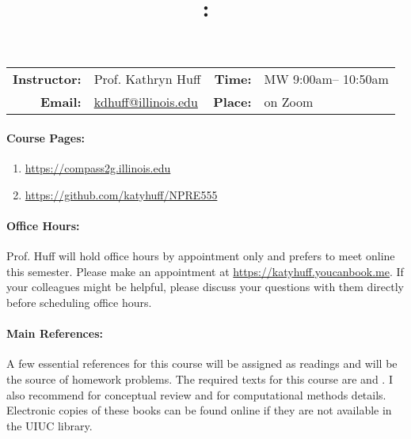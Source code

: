 \documentclass[11pt, a4paper]{article}
\title{\CourseNumber: \CourseTitle\\}
\author{\CourseUniversity}
\date{\CourseSemester \CourseYear}
\makeatletter
\newcommand{\CourseNumber}{NPRE555}
\newcommand{\CourseDays}{MW\xspace}%
\newcommand{\CourseStart}{9:00am\xspace}%
\newcommand{\CourseEnd}{10:50am\xspace}%
\newcommand{\CourseInstructor}{Prof. Kathryn Huff}
\newcommand{\CourseInstructorEmail}{kdhuff@illinois.edu}
\newcommand{\CourseRoom}{on Zoom\xspace}%
\newcommand{\CourseBuilding}{\xspace}%
\newcommand{\TeachingAssistant}{TA Name\xspace}%
\newcommand{\TAOfficeHourDays}{Wednesdays\xspace}%
\newcommand{\TAOfficeHourStart}{1:00pm\xspace}%
\newcommand{\TAOfficeHourEnd}{3:00pm\xspace}%
\newcommand{\TAOfficeHourPlace}{123 Talbot Laboratory\xspace}
\makeatother
\begin{document}
\maketitle
\renewcommand{\arraystretch}{2}
\begin{center}
\begin{table}[h]
\begin{tabularx}{\textwidth}{rXrX}
\hline
\textbf{Instructor:} & \CourseInstructor & \textbf{Time:} & \CourseDays \CourseStart -- \CourseEnd \\
\textbf{Email:} &  \href{mailto:\CourseInstructorEmail}{\CourseInstructorEmail} & \textbf{Place:} & \CourseRoom \CourseBuilding\\
\hline
\end{tabularx}

\end{table}
\end{center}

\paragraph{Course Pages:}
\begin{enumerate}
        \item \url{https://compass2g.illinois.edu}
        \item \url{https://github.com/katyhuff/\CourseNumber}
\end{enumerate}


\paragraph{Office Hours:} Prof. Huff will hold office hours by appointment only
and prefers to meet online this semester. Please make an appointment at 
\url{https://katyhuff.youcanbook.me}. If your colleagues might be helpful, please 
discuss your questions with them directly before scheduling office hours.

\paragraph{Main References:}
A few essential references for this course will be assigned as readings and 
will be the source of homework problems. The required texts for this course are 
\cite{stacey_nuclear_2007} and \cite{bell_nuclear_1970}. I also recommend 
\cite{duderstadt_transport_1979} for conceptual review and 
\cite{lewis_computational_1993} for computational methods details.
Electronic copies of these books can be found online if they are not available
in the UIUC library.
\end{document}
